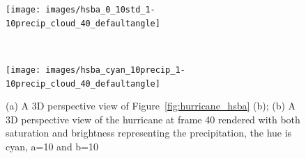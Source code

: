 \begin{figure}
\centering
\begin{minipage}{.49\textwidth}
	\texttt{[image: images/hsba\_0\_10std\_1-10precip\_cloud\_40\_defaultangle]}
	\subcaption{}
\end{minipage}~
\begin{minipage}{.49\textwidth}
	\texttt{[image: images/hsba\_cyan\_10precip\_1-10precip\_cloud\_40\_defaultangle]}
	\subcaption{}
\end{minipage}
\caption[The hurricane at frame 40]{(a) A 3D perspective view of Figure~\ref{fig:hurricane_hsba} (b); (b) A 3D perspective view of the hurricane at frame 40 rendered with both saturation and brightness representing the precipitation, the hue is cyan, a=10 and b=10}
\label{fig:hurricane_40_cyan}
\end{figure}

